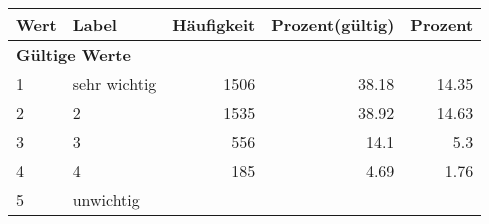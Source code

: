      \begin{longtable}{lXrrr}
     \toprule
     \textbf{Wert} & \textbf{Label} & \textbf{Häufigkeit} & \textbf{Prozent(gültig)} & \textbf{Prozent} \\
     \endhead
     \midrule
     \multicolumn{5}{l}{\textbf{Gültige Werte}}\\

     1 &
     \multicolumn{1}{X}{ sehr wichtig   } &


       \num{1506} &
       \num[round-mode=places,round-precision=2]{38,18} &
         \num[round-mode=places,round-precision=2]{14,35} \\

     2 &
     \multicolumn{1}{X}{ 2   } &


       \num{1535} &
       \num[round-mode=places,round-precision=2]{38,92} &
         \num[round-mode=places,round-precision=2]{14,63} \\

     3 &
     \multicolumn{1}{X}{ 3   } &


       \num{556} &
       \num[round-mode=places,round-precision=2]{14,1} &
         \num[round-mode=places,round-precision=2]{5,3} \\

     4 &
     \multicolumn{1}{X}{ 4   } &


       \num{185} &
       \num[round-mode=places,round-precision=2]{4,69} &
         \num[round-mode=places,round-precision=2]{1,76} \\

     5 &
     \multicolumn{1}{X}{ unwichtig   } &



\end{longtable}

